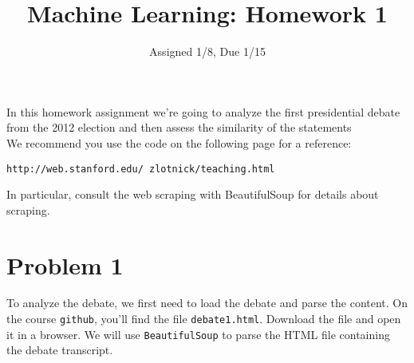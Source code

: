 \documentclass[12pt,letterpaper]{article}
\title{Machine Learning: Homework 1}
\date{Assigned 1/8, Due 1/15}
\begin{document}
\maketitle


In this homework assignment we're going to analyze the first presidential debate from the 2012 election and then assess the similarity of the statements  \\

We recommend you use the code on the following page for a reference: 

{\tt http://web.stanford.edu/~zlotnick/teaching.html}

In particular, consult the web scraping with BeautifulSoup for details about scraping. 


\section*{Problem 1}
To analyze the debate, we first need to load the debate and parse the content.  On the course {\tt github}, you'll find the file {\tt debate1.html}.  Download the file and open it in a browser. We will use {\tt BeautifulSoup} to parse the HTML file containing the debate transcript.
\end{document}
